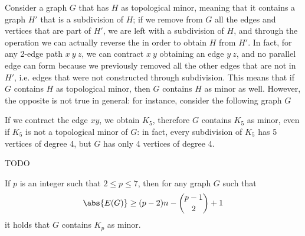 \documentclass[a4paper, 12pt]{report}
\begin{document}
    Consider a graph $G$ that has $H$ as topological minor, meaning that it contains a graph $H'$ that is a subdivision of $H$; if we remove from $G$ all the edges and vertices that are  part of $H'$, we are left with a subdivision of $H$, and through the  operation we can actually reverse the  in order to obtain $H$ from $H'$. In fact, for any 2-edge path $x \ y \ z$, we can contract $x \ y$ obtaining an edge $y \ z$, and no parallel edge can form because we previously removed all the other edges that are not in $H'$, i.e. edges that were not constructed through subdivision. This means that if $G$ contains $H$ as topological minor, then $G$ contains $H$ as minor as well. However, the opposite is not true in general: for instance, consider the following graph $G$

    \begin{figure}[H]
        \centering
    \end{figure}

    If we contract the edge $xy$, we obtain $K_5$, therefore $G$ contains $K_5$ as minor, even if $K_5$ is not a topological minor of $G$: in fact, every subdivision of $K_5$ has 5 vertices of degree 4, but $G$ has only 4 vertices of degree 4.

    TODO 

    \begin{framedthm}{}
        If $p$ is an integer such that $2 \le p \le 7$, then for any graph $G$ such that $$\abs{E(G)} \ge (p - 2)n - \binom{p - 1}{2} + 1$$ it holds that $G$ contains $K_p$ as minor.
    \end{framedthm}
\end{document}
